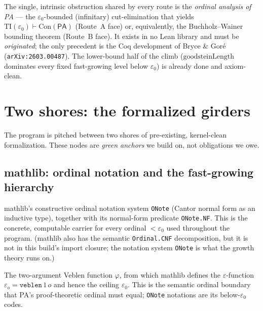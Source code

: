 The single, intrinsic obstruction shared by every route is the \emph{ordinal analysis of PA} --- the
\(\varepsilon_0\)-bounded (infinitary) cut-elimination that yields \(\mathrm{TI}(\varepsilon_0)\vdash
\mathrm{Con}(\mathsf{PA})\) (Route~A face) or, equivalently, the Buchholz--Wainer bounding theorem
(Route~B face).  It exists in no Lean library and must be \emph{originated}; the only precedent is the
Coq development of Bryce \& Goré (\texttt{arXiv:2603.00487}).  The lower-bound half of the climb
(\(\text{goodsteinLength}\) dominates every fixed fast-growing level below \(\varepsilon_0\)) is
already done and axiom-clean.


\chapter{Two shores: the formalized girders}\label{chp:shores}

The program is pitched between two shores of pre-existing, kernel-clean formalization.  These nodes are
\emph{green anchors} we build on, not obligations we owe.

\section{mathlib: ordinal notation and the fast-growing hierarchy}

\begin{definition}\label{def:onote}
  \leanok
mathlib's constructive ordinal notation system \texttt{ONote} (Cantor normal form as an inductive
type), together with its normal-form predicate \texttt{ONote.NF}.  This is the concrete, computable
carrier for every ordinal \(<\varepsilon_0\) used throughout the program.  (mathlib also has the
semantic \texttt{Ordinal.CNF} decomposition, but it is not in this build's import closure; the notation
system \texttt{ONote} is what the growth theory runs on.)
\end{definition}

\begin{definition}\label{def:veblen}
  \leanok
The two-argument Veblen function \(\varphi\), from which mathlib defines the \(\varepsilon\)-function
\(\varepsilon_o = \texttt{veblen}\,1\,o\) and hence the ceiling \(\varepsilon_0\).  This is the
semantic ordinal boundary that PA's proof-theoretic ordinal must equal; \texttt{ONote} notations are
its below-\(\varepsilon_0\) codes.
\end{definition}

